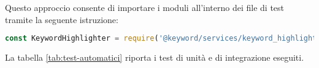 \vspace{10pt}
\par\noindent Questo approccio consente di importare i moduli all’interno dei file di test tramite la seguente istruzione:

\vspace{10pt}
\begin{samepage}
\begin{lstlisting}[language=JavaScript]
  const KeywordHighlighter = require('@keyword/services/keyword_highlighter');
\end{lstlisting}
\end{samepage}

\vspace{10pt}
\par\noindent La tabella \ref{tab:test-automatici} riporta i test di unità e di integrazione eseguiti.

